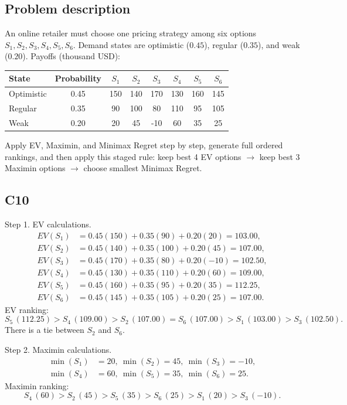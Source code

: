 \begin{ExamProblems}
		\subsection*{Problem description}
		An online retailer must choose one pricing strategy among six options $S_1,S_2,S_3,S_4,S_5,S_6$.
		Demand states are optimistic ($0.45$), regular ($0.35$), and weak ($0.20$).
		Payoffs (thousand USD):
		\begin{center}
			\begin{tabular}{l c c c c c c c}
				\toprule
				State & Probability & $S_1$ & $S_2$ & $S_3$ & $S_4$ & $S_5$ & $S_6$ \\
				\midrule
				Optimistic & 0.45 & 150 & 140 & 170 & 130 & 160 & 145 \\
				Regular & 0.35 & 90 & 100 & 80 & 110 & 95 & 105 \\
				Weak & 0.20 & 20 & 45 & -10 & 60 & 35 & 25 \\
				\bottomrule
			\end{tabular}
		\end{center}
		Apply EV, Maximin, and Minimax Regret step by step, generate full ordered rankings, and then apply this staged rule:
		keep best 4 EV options $\rightarrow$ keep best 3 Maximin options $\rightarrow$ choose smallest Minimax Regret.

		\subsection*{C10}
		Step 1. EV calculations.
		\[
		\begin{aligned}
		EV(S_1)&=0.45(150)+0.35(90)+0.20(20)=103.00,\\
		EV(S_2)&=0.45(140)+0.35(100)+0.20(45)=107.00,\\
		EV(S_3)&=0.45(170)+0.35(80)+0.20(-10)=102.50,\\
		EV(S_4)&=0.45(130)+0.35(110)+0.20(60)=109.00,\\
		EV(S_5)&=0.45(160)+0.35(95)+0.20(35)=112.25,\\
		EV(S_6)&=0.45(145)+0.35(105)+0.20(25)=107.00.
		\end{aligned}
		\]
		EV ranking:
		\[
		S_5\,(112.25)>S_4\,(109.00)>S_2\,(107.00)=S_6\,(107.00)>S_1\,(103.00)>S_3\,(102.50).
		\]
		There is a tie between $S_2$ and $S_6$.

		Step 2. Maximin calculations.
		\[
		\begin{aligned}
		\min(S_1)&=20,\ \min(S_2)=45,\ \min(S_3)=-10,\\
		\min(S_4)&=60,\ \min(S_5)=35,\ \min(S_6)=25.
		\end{aligned}
		\]
		Maximin ranking:
		\[
		S_4\,(60)>S_2\,(45)>S_5\,(35)>S_6\,(25)>S_1\,(20)>S_3\,(-10).
		\]


\end{ExamProblems}
